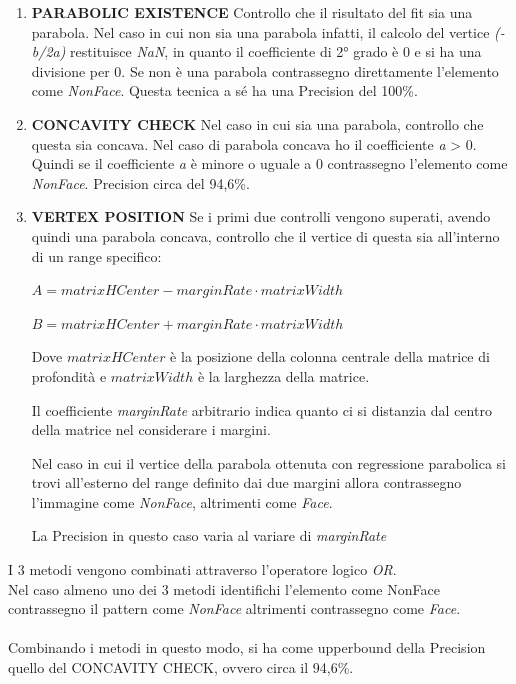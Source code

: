 \documentclass[
  italian,
]{article}
\begin{document}
\begin{enumerate}

\item
\textbf{PARABOLIC EXISTENCE}
\newline
Controllo che il risultato del fit sia una parabola. Nel caso in cui non sia una parabola infatti, il calcolo del vertice \emph{(-b/2a)} restituisce \emph{NaN}, in quanto il coefficiente di 2° grado è 0 e si ha una divisione per 0.
Se non è una parabola contrassegno direttamente l'elemento come \emph{NonFace}.
Questa tecnica a sé ha una Precision del 100\%.

\item
\textbf{CONCAVITY CHECK}
\newline
Nel caso in cui sia una parabola, controllo che questa sia concava.
Nel caso di parabola concava ho il coefficiente \emph{a} > 0.
Quindi se il coefficiente \emph{a} è minore o uguale a 0 contrassegno l'elemento come \emph{NonFace}.
\newline
Precision circa del 94,6\%.

\item
\textbf{VERTEX POSITION}
\newline
Se i primi due controlli vengono superati, avendo quindi una parabola concava, controllo che il vertice di questa sia all'interno di un range specifico:

\(A = matrixHCenter - marginRate \cdot matrixWidth\)

\(B = matrixHCenter + marginRate \cdot matrixWidth\)

Dove \(matrixHCenter\) è la posizione della colonna centrale della
matrice di profondità e \(matrixWidth\) è la larghezza della matrice.

Il coefficiente \emph{marginRate} arbitrario indica quanto ci si distanzia
dal centro della matrice nel considerare i margini.

Nel caso in cui il vertice della parabola ottenuta con regressione
parabolica si trovi all'esterno del range definito dai due margini allora contrassegno l'immagine come \emph{NonFace}, altrimenti
come \emph{Face}.

La Precision in questo caso varia al variare di \emph{marginRate}
\end{enumerate}

I 3 metodi vengono combinati attraverso l'operatore logico \emph{OR}.\\
Nel caso almeno uno dei 3 metodi identifichi l'elemento come NonFace contrassegno il pattern come \emph{NonFace} altrimenti contrassegno come \emph{Face}.\\
\\
Combinando i metodi in questo modo, si ha come upperbound della Precision quello del CONCAVITY CHECK, ovvero circa il 94,6\%.
\end{document}
